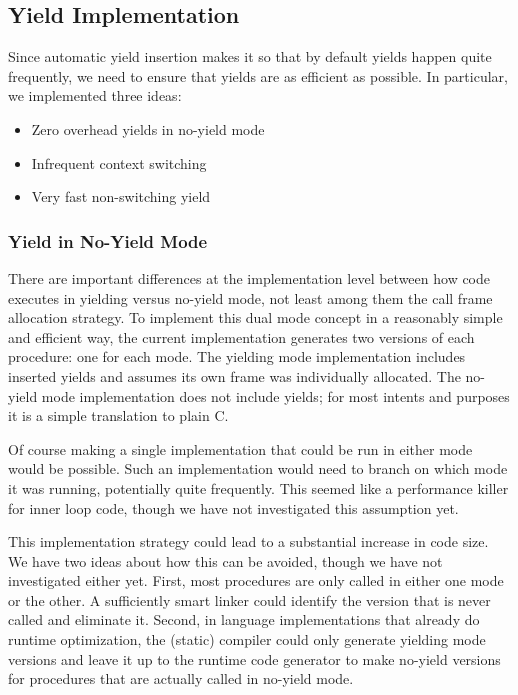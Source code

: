 \documentclass[9pt,preprint]{sigplanconf-2}
\begin{document}
\subsection{Yield Implementation}
\label{sec:yield_imp}

Since automatic yield insertion makes it so that by default yields happen quite frequently, we need to ensure that yields are as efficient as possible.
In particular, we implemented three ideas:

\begin{itemize}
\item Zero overhead yields in no-yield mode
\item Infrequent context switching
\item Very fast non-switching yield
\end{itemize}

\subsubsection{Yield in No-Yield Mode}

There are important differences at the implementation level between how code executes in yielding versus no-yield mode, not least among them the call frame allocation strategy.
To implement this dual mode concept in a reasonably simple and efficient way, the current \charcoal{} implementation generates two versions of each procedure: one for each mode.
The yielding mode implementation includes inserted yields and assumes its own frame was individually allocated.
The no-yield mode implementation does not include yields; for most intents and purposes it is a simple translation to plain C.

Of course making a single implementation that could be run in either mode would be possible.
Such an implementation would need to branch on which mode it was running, potentially quite frequently.
This seemed like a performance killer for inner loop code, though we have not investigated this assumption yet.

This implementation strategy could lead to a substantial increase in code size.
We have two ideas about how this can be avoided, though we have not investigated either yet.
First, most procedures are only called in either one mode or the other.
A sufficiently smart linker could identify the version that is never called and eliminate it.
Second, in language implementations that already do runtime optimization, the (static) compiler could only generate yielding mode versions and leave it up to the runtime code generator to make no-yield versions for procedures that are actually called in no-yield mode.
\end{document}
